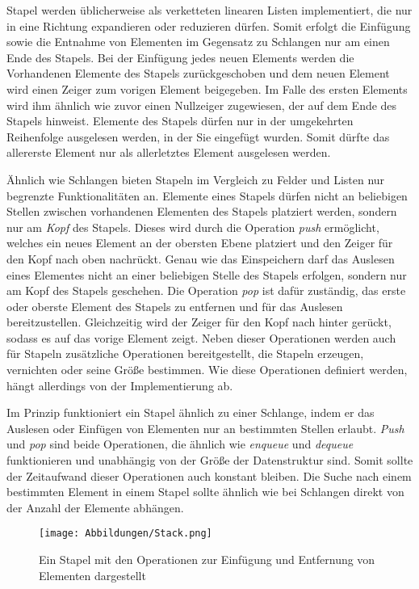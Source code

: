 Stapel werden üblicherweise als verketteten linearen Listen implementiert, die nur in eine Richtung expandieren oder reduzieren dürfen. Somit erfolgt die Einfügung sowie die Entnahme von Elementen im Gegensatz zu Schlangen nur am einen Ende des Stapels. Bei der Einfügung jedes neuen Elements werden die Vorhandenen Elemente des Stapels zurückgeschoben und dem neuen Element wird einen Zeiger zum vorigen Element beigegeben. Im Falle des ersten Elements wird ihm ähnlich wie zuvor einen Nullzeiger zugewiesen, der auf dem Ende des Stapels hinweist. Elemente des Stapels dürfen nur in der umgekehrten Reihenfolge ausgelesen werden, in der Sie eingefügt wurden. Somit dürfte das allererste Element nur als allerletztes Element ausgelesen werden. \autocite[363]{gumm_band_2016}

Ähnlich wie Schlangen bieten Stapeln im Vergleich zu Felder und Listen nur begrenzte Funktionalitäten an. Elemente eines Stapels dürfen nicht an beliebigen Stellen zwischen vorhandenen Elementen des Stapels platziert werden, sondern nur am \textit{Kopf} des Stapels. Dieses wird durch die Operation \textit{push} ermöglicht, welches ein neues Element an der obersten Ebene platziert und den Zeiger für den Kopf nach oben nachrückt. Genau wie das Einspeichern darf das Auslesen eines Elementes nicht an einer beliebigen Stelle des Stapels erfolgen, sondern nur am Kopf des Stapels geschehen. Die Operation \textit{pop} ist dafür zuständig, das erste oder oberste Element des Stapels zu entfernen und für das Auslesen bereitzustellen. Gleichzeitig wird der Zeiger für den Kopf nach hinter gerückt, sodass es auf das vorige Element zeigt. Neben dieser Operationen werden auch für Stapeln zusätzliche Operationen bereitgestellt, die Stapeln erzeugen, vernichten oder seine Größe bestimmen. Wie diese Operationen definiert werden, hängt allerdings von der Implementierung ab. \autocite[614]{ernst_grundkurs_2020} \autocite[45-46]{ollmert_datenstrukturen_2020}

Im Prinzip funktioniert ein Stapel ähnlich zu einer Schlange, indem er das Auslesen oder Einfügen von Elementen nur an bestimmten Stellen erlaubt. \textit{Push} und \textit{pop} sind beide Operationen, die ähnlich wie \textit{enqueue} und \textit{dequeue} funktionieren und unabhängig von der Größe der Datenstruktur sind. Somit sollte der Zeitaufwand dieser Operationen auch konstant bleiben. Die Suche nach einem bestimmten Element in einem Stapel sollte ähnlich wie bei Schlangen direkt von der Anzahl der Elemente abhängen.

\begin{figure}[t]
	\texttt{[image: Abbildungen/Stack.png]}
	\centering
	\caption{Ein Stapel mit den Operationen zur Einfügung und Entfernung von Elementen dargestellt \autocite[371]{gumm_band_2016}}
	\label{fig: stack}
\end{figure}

